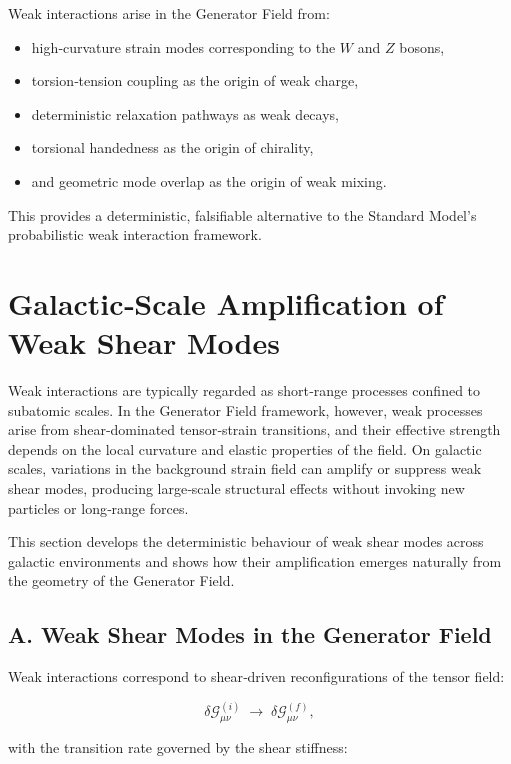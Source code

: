 \documentclass[reprint,amsmath,amssymb,aps,prl,floatfix]{revtex4-2}
\begin{document}
Weak interactions arise in the Generator Field from:

\begin{itemize}
\item high‑curvature strain modes corresponding to the \(W\) and \(Z\) bosons,  
\item torsion‑tension coupling as the origin of weak charge,  
\item deterministic relaxation pathways as weak decays,  
\item torsional handedness as the origin of chirality,  
\item and geometric mode overlap as the origin of weak mixing.
\end{itemize}

This provides a deterministic, falsifiable alternative to the Standard Model’s probabilistic weak interaction framework.

\section{Galactic‑Scale Amplification of Weak Shear Modes}

Weak interactions are typically regarded as short‑range processes confined to subatomic scales. In the Generator Field framework, however, weak processes arise from shear‑dominated tensor‑strain transitions, and their effective strength depends on the local curvature and elastic properties of the field. On galactic scales, variations in the background strain field can amplify or suppress weak shear modes, producing large‑scale structural effects without invoking new particles or long‑range forces.
\medskip

This section develops the deterministic behaviour of weak shear modes across galactic environments and shows how their amplification emerges naturally from the geometry of the Generator Field.

\subsection{A. Weak Shear Modes in the Generator Field}

Weak interactions correspond to shear‑driven reconfigurations of the tensor field:

\[
\delta\mathcal{G}_{\mu\nu}^{(i)}
\;\longrightarrow\;
\delta\mathcal{G}_{\mu\nu}^{(f)},
\]

with the transition rate governed by the shear stiffness:
\end{document}
